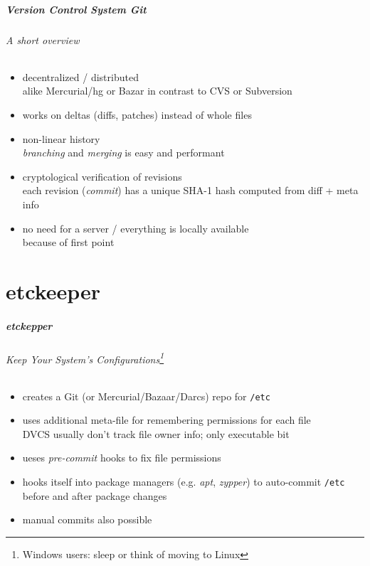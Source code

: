 \documentclass[english,hyperref={pdfpagelabels=false},aspectratio=169]{beamer}
\begin{document}
\begin{frame}[label=git]
  \frametitle{Version Control System \textit{Git}}
  \framesubtitle{A short overview}
  \begin{itemize}
    \item decentralized / distributed\\
      {\scriptsize alike Mercurial/hg or Bazar in contrast to CVS or Subversion}
    \item works on deltas {\scriptsize\color{fzjgray50}(diffs, patches)} instead of whole files
    \item non-linear history\\
      {\scriptsize \textit{branching} and \textit{merging} is easy and performant}
    \item cryptological verification of revisions\\
      {\scriptsize each revision (\textit{commit}) has a unique SHA-1 hash computed from diff + meta info}
    \item no need for a server / everything is locally available\\
      {\scriptsize because of first point}
  \end{itemize}
\end{frame}



\part{etckeeper}
\makepart

\begin{frame}[label=etckeeper]
  \frametitle{etckepper}
  \framesubtitle{Keep Your System's Configurations\footnote{\tiny Windows users: sleep or think of moving to Linux}}
  \begin{itemize}
    \item creates a Git {\scriptsize\color{fzjgray50}(or Mercurial/Bazaar/Darcs)} repo for \texttt{/etc}
    \item uses additional meta-file for remembering permissions for each file\\
      {\scriptsize DVCS usually don't track file owner info; only executable bit}
    \item ueses \textit{pre-commit} hooks to fix file permissions
    \item hooks itself into package managers {\scriptsize\color{fzjgray50}(e.g. \textit{apt}, \textit{zypper})} to auto-commit \texttt{/etc} before and after package changes
    \item manual commits also possible
  \end{itemize}
\end{frame}
\end{document}
